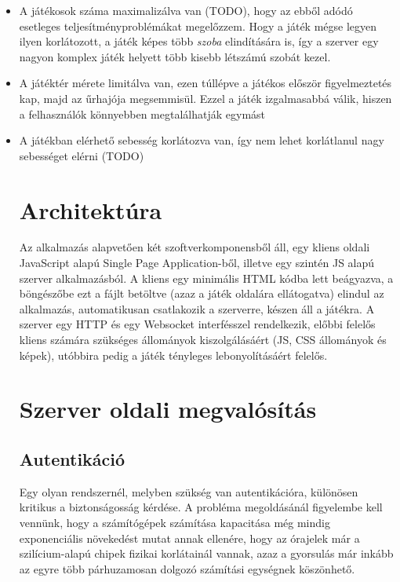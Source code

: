 \begin{itemize}
  \item A játékosok száma maximalizálva van (TODO), hogy az ebből adódó
    esetleges teljesítményproblémákat megelőzzem. Hogy a játék mégse legyen
    ilyen korlátozott, a játék képes több \emph{szoba} elindítására is, így a
    szerver egy nagyon komplex játék helyett több kisebb létszámú szobát kezel.
  \item A játéktér mérete limitálva van, ezen túllépve a játékos először
    figyelmeztetés kap, majd az űrhajója megsemmisül. Ezzel a játék izgalmasabbá
    válik, hiszen a felhasználók könnyebben megtalálhatják egymást
  \item A játékban elérhető sebesség korlátozva van, így nem lehet korlátlanul
    nagy sebességet elérni (TODO)

\section{Architektúra}

Az alkalmazás alapvetően két szoftverkomponensből áll, egy kliens oldali
JavaScript alapú Single Page Application-ből, illetve egy szintén JS alapú
szerver alkalmazásból.  A kliens egy minimális HTML kódba lett beágyazva, a
böngészőbe ezt a fájlt betöltve (azaz a játék oldalára ellátogatva) elindul az
alkalmazás, automatikusan csatlakozik a szerverre, készen áll a játékra.  A
szerver egy HTTP és egy Websocket interfésszel rendelkezik, előbbi felelős
kliens számára szükséges állományok kiszolgálásáért (JS, CSS állományok és
képek), utóbbira pedig a játék tényleges lebonyolításáért felelős.

\section{Szerver oldali megvalósítás}

\subsection{Autentikáció}

Egy olyan rendszernél, melyben szükség van autentikációra, különösen kritikus a
biztonságosság kérdése. A probléma megoldásánál figyelembe kell vennünk, hogy a
számítógépek számítása kapacitása még mindig exponenciális növekedést mutat
annak ellenére, hogy az órajelek már a szilícium-alapú chipek fizikai
korlátainál vannak, azaz a gyorsulás már inkább az egyre több párhuzamosan
dolgozó számítási egységnek köszönhető.


\end{itemize}
